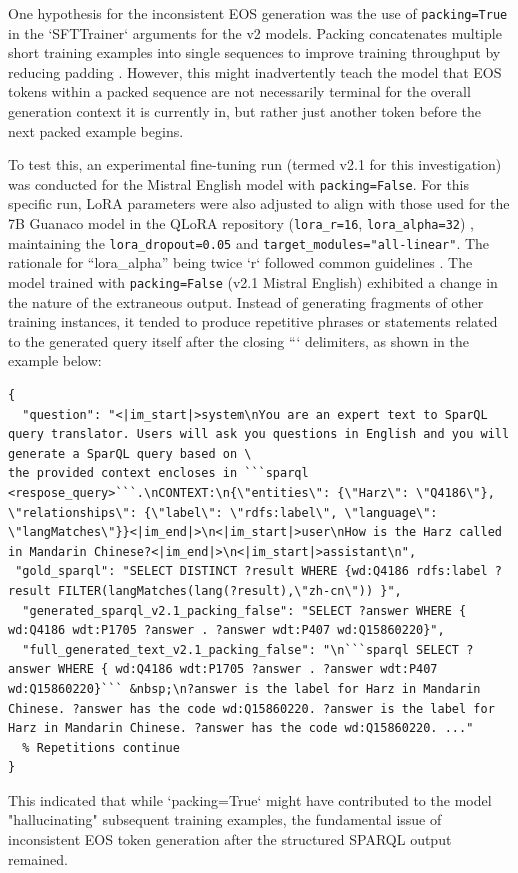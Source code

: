 One hypothesis for the inconsistent EOS generation was the use of \texttt{packing=True} in the `SFTTrainer` arguments for the v2 models. 
Packing concatenates multiple short training examples into single sequences to improve training throughput by reducing padding \cite{kundu2024enhancing}.
However, this might inadvertently teach the model that EOS tokens within a packed sequence are not necessarily terminal for the overall generation context it is currently in, but rather just another token before the next packed example begins.

To test this, an experimental fine-tuning run (termed v2.1 for this investigation) was conducted for the Mistral English model with \texttt{packing=False}. 
For this specific run, LoRA parameters were also adjusted to align with those used for the 7B Guanaco model in the QLoRA repository (\texttt{lora\_r=16}, \texttt{lora\_alpha=32}) \cite{artidoro_qlora_2023}, maintaining the \texttt{lora\_dropout=0.05} and \texttt{target\_modules="all-linear"}. The rationale for ``lora\_alpha'' being twice `r` followed common guidelines \cite{Raschka2023PracticalTips}.
The model trained with \texttt{packing=False} (v2.1 Mistral English) exhibited a change in the nature of the extraneous output.
Instead of generating fragments of other training instances, it tended to produce repetitive phrases or statements related to the generated query itself after the closing ``` delimiters, as shown in the example below:
\begin{lstlisting}[breaklines]
{
  "question": "<|im_start|>system\nYou are an expert text to SparQL query translator. Users will ask you questions in English and you will generate a SparQL query based on \
the provided context encloses in ```sparql <respose_query>```.\nCONTEXT:\n{\"entities\": {\"Harz\": \"Q4186\"}, \"relationships\": {\"label\": \"rdfs:label\", \"language\": \"langMatches\"}}<|im_end|>\n<|im_start|>user\nHow is the Harz called in Mandarin Chinese?<|im_end|>\n<|im_start|>assistant\n",
 "gold_sparql": "SELECT DISTINCT ?result WHERE {wd:Q4186 rdfs:label ?result FILTER(langMatches(lang(?result),\"zh-cn\")) }",
  "generated_sparql_v2.1_packing_false": "SELECT ?answer WHERE { wd:Q4186 wdt:P1705 ?answer . ?answer wdt:P407 wd:Q15860220}",
  "full_generated_text_v2.1_packing_false": "\n```sparql SELECT ?answer WHERE { wd:Q4186 wdt:P1705 ?answer . ?answer wdt:P407 wd:Q15860220}``` &nbsp;\n?answer is the label for Harz in Mandarin Chinese. ?answer has the code wd:Q15860220. ?answer is the label for Harz in Mandarin Chinese. ?answer has the code wd:Q15860220. ..." 
  % Repetitions continue
}
\end{lstlisting}
This indicated that while `packing=True` might have contributed to the model "hallucinating" subsequent training examples, the fundamental issue of inconsistent EOS token generation after the structured SPARQL output remained.

